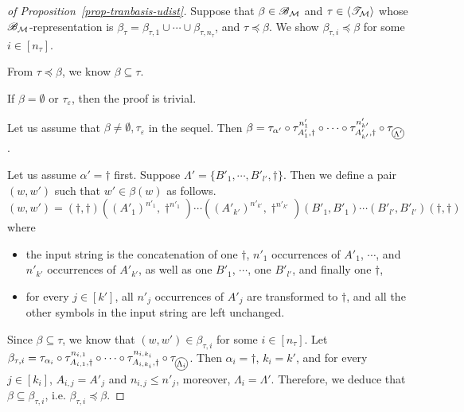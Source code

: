 \begin{proof}[of Proposition~\ref{prop-tranbasis-udist}]

Suppose that $\beta \in {\mathscr{B} }_{\mathcal{M} }$ and $\tau \in \langle {\mathscr{T} }_{\mathcal{M} } \rangle$ whose ${\mathscr{B} }_{\mathcal{M} }$-representation is $\beta_\tau=\beta_{\tau, 1} \cup \cdots \cup \beta_{\tau, n_\tau}$, and $\tau \preceq \beta$. We show $ \beta_{\tau, i} \preceq \beta$ for some $i \in [n_\tau]$.


From $\tau \preceq \beta$, we know $\beta \subseteq \tau$.

If $\beta = \emptyset$ or $\tau_\varepsilon$, then the proof is trivial. 

Let us assume that $\beta \neq \emptyset, \tau_\varepsilon$ in the sequel.
Then $\beta = \tau_{\alpha'} \circ \tau^{n'_{1}}_{A'_{1}, \dag} \circ \cdots \circ  \tau^{n'_{k'}}_{A'_{ k'}, \dag} \circ \tau_{\mathcircled{\Lambda'}}$.

Let us assume $\alpha' = \dag$ first. Suppose $\Lambda' = \{B'_{1}, \cdots, B'_{ l'}, \dag\}$.  Then we define a pair $(w, w')$ such that $w' \in \beta(w)$ as follows. 
%
$$(w, w') = (\dag, \dag) ((A'_{1})^{n'_{1}}, \dag^{n'_{1}}) \cdots ((A'_{k'})^{n'_{k'}}, \dag^{n'_{k'}}) (B'_{1}, B'_{1}) \cdots (B'_{l'}, B'_{l'}) (\dag, \dag)$$ 
%
where 
\begin{itemize}
\item the input string is the concatenation of one $\dag$, $n'_{1}$ occurrences of $A'_{1}$, $\cdots$, and $n'_{k'}$ occurrences of $A'_{k'}$, as well as one $B'_1$, $\cdots$, one $B'_{l'}$, and finally one $\dag$, 
%
\item for every $j \in [k']$,  all $n'_{j}$ occurrences of $A'_{j}$ are transformed to $\dag$, and all the other symbols in the input string are left unchanged.
\end{itemize}
Since $\beta \subseteq \tau$, we know that $(w, w') \in \beta_{\tau, i}$ for some $i \in [n_\tau]$. 
Let $ \beta_{\tau, i} = \tau_{\alpha_i} \circ \tau^{n_{i,1}}_{A_{i,1}, \dag} \circ \cdots \circ  \tau^{n_{i, k_i}}_{A_{i,k_i}, \dag} \circ \tau_{\mathcircled{\Lambda_i}}$.
Then $\alpha_i = \dag$, $k_i = k'$, and for every $j \in [k_i]$, $A_{i, j} = A'_{j}$ and $n_{i, j} \le n'_{ j}$, moreover, $\Lambda_i = \Lambda'$.
Therefore, we deduce that $\beta \subseteq  \beta_{\tau, i}$, i.e. $\beta_{\tau, i} \preceq \beta$.


\end{proof}
